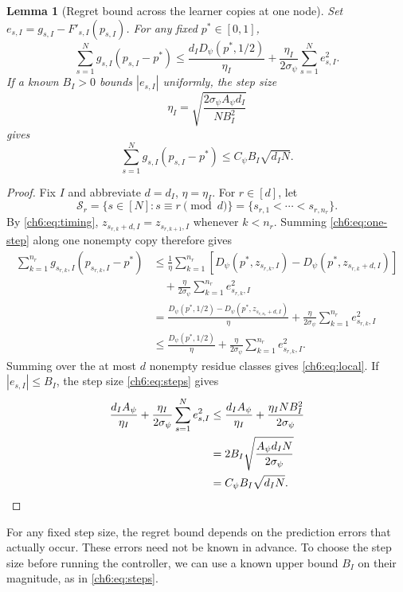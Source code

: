 \documentclass[11pt]{article}
\theoremstyle{plain}
\newtheorem{Thm:Lemma}[Thm:Theorem]{Lemma}
\theoremstyle{remark}
\numberwithin{equation}{section}
\begin{document}
\begin{Thm:Lemma}[Regret bound across the learner copies at one node]\label{ch6:lem:local}
Set $e_{s,I}=g_{s,I}-F'_{s,I}(p_{s,I})$. For any fixed $p^*\in[0,1]$,
\begin{equation}\label{ch6:eq:local}
 \sum_{s=1}^Ng_{s,I}(p_{s,I}-p^*)
 \le\frac{d_I{D_\psi}(p^*,1/2)}{\eta_I}
 +\frac{\eta_I}{2\sigma_\psi}\sum_{s=1}^Ne_{s,I}^2.
\end{equation}
If a known $B_I>0$ bounds $|e_{s,I}|$ uniformly, the step size
\begin{equation}\label{ch6:eq:steps}
 \eta_I=\sqrt{\frac{2\sigma_\psi{A_\psi} d_I}{NB_I^2}}
\end{equation}
gives
\begin{equation}\label{ch6:eq:local-opt}
 \sum_{s=1}^Ng_{s,I}(p_{s,I}-p^*)
 \le{C_\psi} B_I\sqrt{d_IN}.
\end{equation}
\end{Thm:Lemma}
\begin{proof}
Fix $I$ and abbreviate $d=d_I$, $\eta=\eta_I$.  For
$r\in[d]$, let
\[
\mathcal S_r=\{s\in[N]:s\equiv r\pmod d\}
=\{s_{r,1}<\cdots<s_{r,n_r}\}.
\]
By \eqref{ch6:eq:timing},
$z_{s_{r,k}+d,I}=z_{s_{r,k+1},I}$ whenever $k<n_r$.
Summing \eqref{ch6:eq:one-step} along one nonempty copy therefore gives
\begin{align*}
\sum_{k=1}^{n_r}g_{s_{r,k},I}(p_{s_{r,k},I}-p^*)
&\le\frac{1}{\eta}
 \sum_{k=1}^{n_r}\left[
 D_\psi(p^*,z_{s_{r,k},I})
 -D_\psi(p^*,z_{s_{r,k}+d,I})\right]\\
&\quad+\frac{\eta}{2\sigma_\psi}
 \sum_{k=1}^{n_r}e_{s_{r,k},I}^2\\
&=\frac{D_\psi(p^*,1/2)
 -D_\psi(p^*,z_{s_{r,n_r}+d,I})}{\eta}
 +\frac{\eta}{2\sigma_\psi}
 \sum_{k=1}^{n_r}e_{s_{r,k},I}^2\\
&\le\frac{D_\psi(p^*,1/2)}{\eta}
 +\frac{\eta}{2\sigma_\psi}
 \sum_{k=1}^{n_r}e_{s_{r,k},I}^2.
\end{align*}
Summing over the at most $d$ nonempty residue classes gives
\eqref{ch6:eq:local}.
If $|e_{s,I}|\le B_I$, the step size \eqref{ch6:eq:steps} gives
\begin{align*}
\frac{d_IA_\psi}{\eta_I}
+\frac{\eta_I}{2\sigma_\psi}\sum_{s=1}^{N}e_{s,I}^2
&\le\frac{d_IA_\psi}{\eta_I}
+\frac{\eta_INB_I^2}{2\sigma_\psi}\\
&=2B_I\sqrt{\frac{A_\psi d_IN}{2\sigma_\psi}}\\
&=C_\psi B_I\sqrt{d_IN}.\qedhere
\end{align*}
\end{proof}
For any fixed step size, the regret bound depends on the prediction errors
that actually occur. These errors need not be known in advance. To choose
the step size before running the controller, we can use a known upper
bound $B_I$ on their magnitude, as in \eqref{ch6:eq:steps}.
\end{document}
